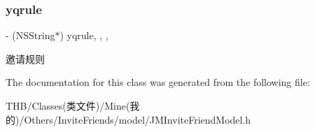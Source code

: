 \subsubsection{\texorpdfstring{yqrule}{yqrule}}
{\footnotesize\ttfamily -\/ (N\+S\+String$\ast$) yqrule\hspace{0.3cm}{\ttfamily [read]}, {\ttfamily [write]}, {\ttfamily [nonatomic]}, {\ttfamily [copy]}}

邀请规则 

The documentation for this class was generated from the following file\+:\begin{DoxyCompactItemize}
\item 
T\+H\+B/\+Classes(类文件)/\+Mine(我的)/\+Others/\+Invite\+Friends/model/J\+M\+Invite\+Friend\+Model.\+h\end{DoxyCompactItemize}

